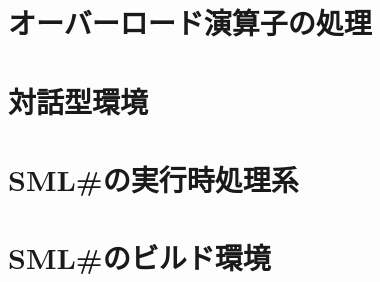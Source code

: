 \documentclass{jbook}
\newcommand{\txt}[2]{#1}
\newcommand{\smlsharp}{SML\#}
\begin{document}
\chapter{\txt
{オーバーロード演算子の処理}
{Primitive Operator Overloading}
}
\label{chap:primitiveoverloading}

\chapter{\txt
{対話型環境}
{Interactive mode}
}
\label{chap:interactivemode}

\chapter{\txt
{\smlsharp{}の実行時処理系}
{\smlsharp{} Runtime System }
}
\label{chap:runtimesystem}

\chapter{\txt
{\smlsharp{}のビルド環境}
{Building Environment of \smlsharp{}}
}
\label{chap:buildsystem}

\fi%


% 
\end{document}
